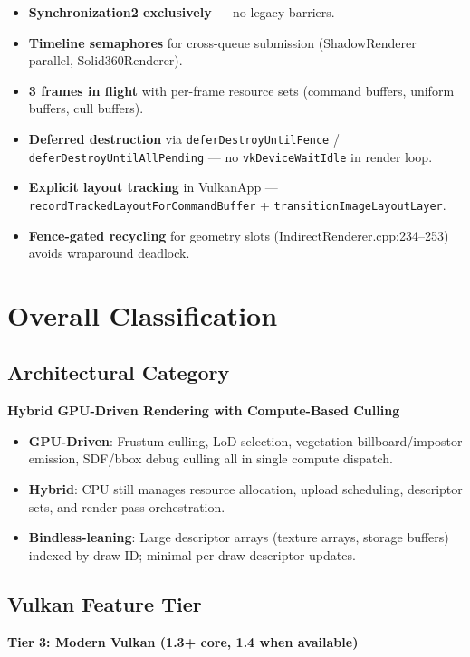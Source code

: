 \documentclass[11pt,a4paper]{article}
\begin{document}
\begin{itemize}
    \item \textbf{Synchronization2 exclusively} — no legacy barriers.
    \item \textbf{Timeline semaphores} for cross-queue submission (ShadowRenderer parallel, Solid360Renderer).
    \item \textbf{3 frames in flight} with per-frame resource sets (command buffers, uniform buffers, cull buffers).
    \item \textbf{Deferred destruction} via \texttt{deferDestroyUntilFence} / \texttt{deferDestroyUntilAllPending} — no \texttt{vkDeviceWaitIdle} in render loop.
    \item \textbf{Explicit layout tracking} in VulkanApp — \texttt{recordTrackedLayoutForCommandBuffer} + \texttt{transitionImageLayoutLayer}.
    \item \textbf{Fence-gated recycling} for geometry slots (IndirectRenderer.cpp:234–253) avoids wraparound deadlock.
\end{itemize}

\section{Overall Classification}

\subsection{Architectural Category}
\textbf{Hybrid GPU-Driven Rendering with Compute-Based Culling}

\begin{itemize}
    \item \textbf{GPU-Driven}: Frustum culling, LoD selection, vegetation billboard/impostor emission, SDF/bbox debug culling all in single compute dispatch.
    \item \textbf{Hybrid}: CPU still manages resource allocation, upload scheduling, descriptor sets, and render pass orchestration.
    \item \textbf{Bindless-leaning}: Large descriptor arrays (texture arrays, storage buffers) indexed by draw ID; minimal per-draw descriptor updates.
\end{itemize}

\subsection{Vulkan Feature Tier}
\textbf{Tier 3: Modern Vulkan (1.3+ core, 1.4 when available)}
\end{document}
